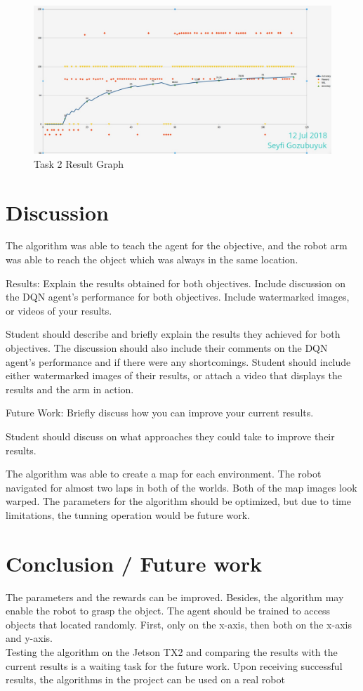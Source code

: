\documentclass[10pt,journal,compsoc]{IEEEtran}
\begin{document}
\begin{figure}[thpb]
      \centering
      \includegraphics[width=\linewidth]{figures/Task2.png}
      \caption{Task 2 Result Graph}
      \label{fig:t2g}
\end{figure}

\section{Discussion}
The algorithm was able to teach the agent for the objective, and the robot arm was able to reach the object which was always in the same location.

Results: Explain the results obtained for both objectives. Include discussion on the DQN agent's performance for both objectives. Include watermarked images, or videos of your results.

Student should describe and briefly explain the results they achieved for both objectives. The discussion should also include their comments on the DQN agent's performance and if there were any shortcomings. Student should include either watermarked images of their results, or attach a video that displays the results and the arm in action.

Future Work: Briefly discuss how you can improve your current results.

Student should discuss on what approaches they could take to improve their results.

The algorithm was able to create a map for each environment. The robot navigated for almost two laps in both of the worlds. Both of the map images look warped. The parameters for the algorithm should be optimized, but due to time limitations, the tunning operation would be future work.

\section{Conclusion / Future work}
The parameters and the rewards can be improved. Besides, the algorithm may enable the robot to grasp the object. The agent should be trained to access objects that located randomly. First, only on the x-axis, then both on the x-axis and y-axis.\\
Testing the algorithm on the Jetson TX2 and comparing the results with the current results is a waiting task for the future work. Upon receiving successful results, the algorithms in the project can be used on a real robot
\end{document}
